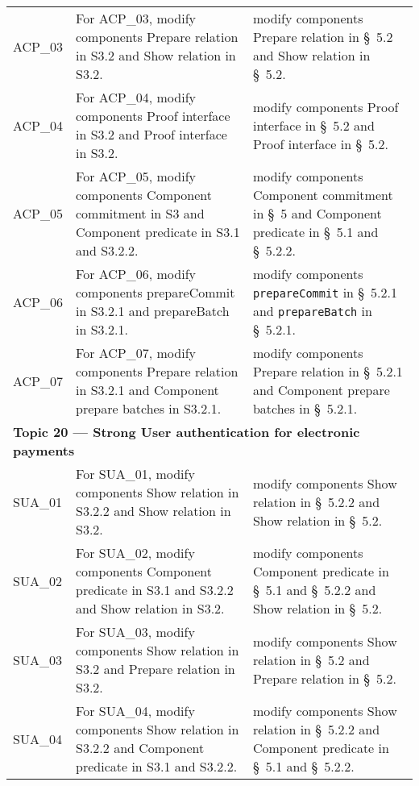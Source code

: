 \begin{landscape}
\begin{longtable}{p{3cm} p{10cm} p{7cm}}
ACP\_03 &
For ACP\_03, modify components Prepare relation in S3.2 and Show relation in S3.2. &
modify components Prepare relation in \S~5.2 and Show relation in \S~5.2. \\

ACP\_04 &
For ACP\_04, modify components Proof interface in S3.2 and Proof interface in S3.2. &
modify components Proof interface in \S~5.2 and Proof interface in \S~5.2. \\

ACP\_05 &
For ACP\_05, modify components Component commitment in S3 and Component predicate in S3.1 and S3.2.2. &
modify components Component commitment in \S~5 and Component predicate in \S~5.1 and \S~5.2.2. \\

ACP\_06 &
For ACP\_06, modify components prepareCommit in S3.2.1 and prepareBatch in S3.2.1. &
modify components \texttt{prepareCommit} in \S~5.2.1 and \texttt{prepareBatch} in \S~5.2.1. \\

ACP\_07 &
For ACP\_07, modify components Prepare relation in S3.2.1 and Component prepare batches in S3.2.1. &
modify components Prepare relation in \S~5.2.1 and Component prepare batches in \S~5.2.1. \\[1em]


\multicolumn{3}{l}{\textbf{Topic 20 — Strong User authentication for electronic payments}}\\

SUA\_01 &
For SUA\_01, modify components Show relation in S3.2.2 and Show relation in S3.2. &
modify components Show relation in \S~5.2.2 and Show relation in \S~5.2. \\

SUA\_02 &
For SUA\_02, modify components Component predicate in S3.1 and S3.2.2 and Show relation in S3.2. &
modify components Component predicate in \S~5.1 and \S~5.2.2 and Show relation in \S~5.2. \\

SUA\_03 &
For SUA\_03, modify components Show relation in S3.2 and Prepare relation in S3.2. &
modify components Show relation in \S~5.2 and Prepare relation in \S~5.2. \\

SUA\_04 &
For SUA\_04, modify components Show relation in S3.2.2 and Component predicate in S3.1 and S3.2.2. &
modify components Show relation in \S~5.2.2 and Component predicate in \S~5.1 and \S~5.2.2. \\


\end{longtable}
\end{landscape}
